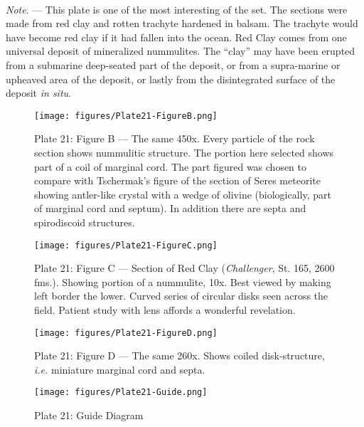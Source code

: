 \documentclass[a4paper, 12pt, oneside]{article}
\begin{document}
\paragraph{}
\emph{Note}. --- This plate is one of the most interesting of the set. The sections were made from red clay and rotten trachyte hardened in balsam. The trachyte would have become red clay if it had fallen into the ocean. Red Clay comes from one universal deposit of mineralized nummulites. The ``clay'' may have been erupted from a submarine deep-seated part of the deposit, or from a supra-marine or upheaved area of the deposit, or lastly from the disintegrated surface of the deposit \emph{in situ}.
\clearpage
\begin{figure}[b]
\centering
\texttt{[image: figures/Plate21-FigureB.png]}
\caption{\small Plate 21: Figure B --- The same 450x. Every particle of the rock section shows nummulitic structure. The portion here selected shows part of a coil of marginal cord. The part figured was chosen to compare with Tschermak's figure of the section of Seres meteorite showing antler-like crystal with a wedge of olivine (biologically, part of marginal cord and septum). In addition there are septa and spirodiscoid structures.}
\end{figure}
\clearpage
\begin{figure}[b]
\centering
\texttt{[image: figures/Plate21-FigureC.png]}
\caption{\small Plate 21: Figure C --- Section of Red Clay (\emph{Challenger}, St. 165, 2600 fms.). Showing portion of a nummulite, 10x. Best viewed by making left border the lower. Curved series of circular disks seen across the field. Patient study with lens affords a wonderful revelation.}
\end{figure}
\clearpage
\begin{figure}[b]
\centering
\texttt{[image: figures/Plate21-FigureD.png]}
\caption{\small Plate 21: Figure D --- The same 260x. Shows coiled disk-structure, \emph{i.e.} miniature marginal cord and septa.}
\end{figure}
\clearpage
\begin{figure}[b]
\centering
\texttt{[image: figures/Plate21-Guide.png]}
\caption{\small Plate 21: Guide Diagram}
\end{figure}
\end{document}

